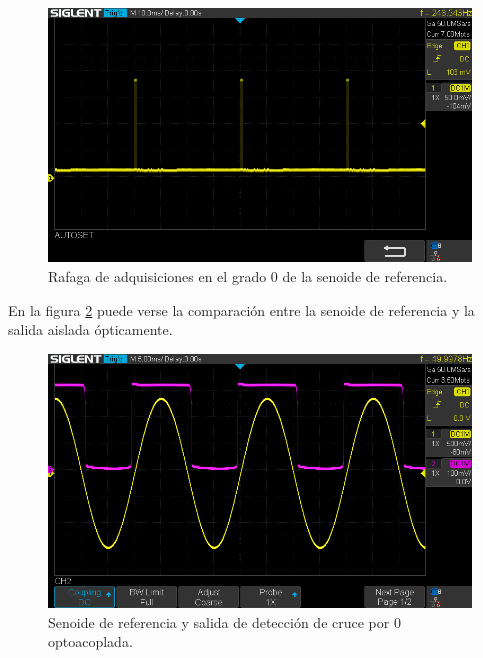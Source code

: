 \vspace{5mm}

\begin{figure}[ht]
	\centering
	\includegraphics[width=130mm]{./Figures/rafagaCero.png}
	\caption{Rafaga de adquisiciones en el grado 0 de la senoide de referencia.}
	\label{fig:rafagaCero}
\end{figure}

\vspace{5mm}

En la figura \ref{fig:zeroCross} puede verse la comparación entre la senoide de referencia y la salida aislada ópticamente.

\vspace{5mm}

\begin{figure}[ht]
	\centering
	\includegraphics[width=130mm]{./Figures/zeroCross.png}
	\caption{Senoide de referencia y salida de detección de cruce por 0 optoacoplada.}
	\label{fig:zeroCross}
\end{figure}

\vspace{5mm}

